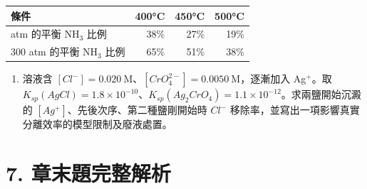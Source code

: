 \documentclass[11pt,a4paper]{article}
\newcounter{none}
\providecommand{\tightlist}{%
  \setlength{\itemsep}{0pt}\setlength{\parskip}{0pt}}
\begin{document}
{\def\LTcaptype{none} %
\begin{longtable}[]{@{}lrrr@{}}
\toprule\noalign{}
條件 & 400°C & 450°C & 500°C \\
\midrule\noalign{}
\endhead
\bottomrule\noalign{}
\endlastfoot
100 atm 的平衡 NH\(_3\) 比例 & 38\% & 27\% & 19\% \\
300 atm 的平衡 NH\(_3\) 比例 & 65\% & 51\% & 38\% \\
\end{longtable}
}

\begin{enumerate}
\def\labelenumi{\arabic{enumi}.}
\setcounter{enumi}{15}
\tightlist
\item
  溶液含 \([Cl^-]=0.020\ \mathrm M\)、\([CrO_4^{2-}]=0.0050\ \mathrm M\)，逐漸加入 Ag\(^+\)。取 \(K_{sp}(AgCl)=1.8\times10^{-10}\)、\(K_{sp}(Ag_2CrO_4)=1.1\times10^{-12}\)。求兩鹽開始沉澱的 \([Ag^+]\)、先後次序、第二種鹽剛開始時 \(Cl^-\) 移除率，並寫出一項影響真實分離效率的模型限制及廢液處置。
\end{enumerate}

\section{7. 章末題完整解析}\label{ux7ae0ux672bux984cux5b8cux6574ux89e3ux6790}
\end{document}
